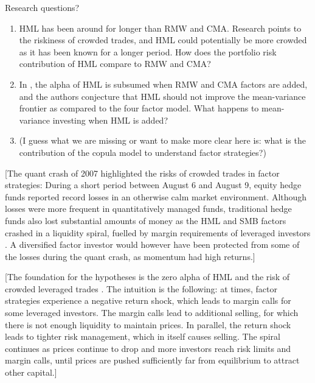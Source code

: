 Research questions?
\begin{enumerate}
	\item HML has been around for longer than RMW and CMA. Research points to the riskiness of crowded trades, and HML could potentially be more crowded as it has been known for a longer period. How does the portfolio risk contribution of HML compare to RMW and CMA?
	\item In \textcite{FF2015}, the alpha of HML is subsumed when RMW and CMA factors are added, and the authors conjecture that HML should not improve the mean-variance frontier as compared to the four factor model. What happens to mean-variance investing when HML is added?
	\item (I guess what we are missing or want to make more clear here is: what is the contribution of the copula model to understand factor strategies?)
\end{enumerate}

[The quant crash of 2007 highlighted the risks of crowded trades in factor strategies: During a short period between August 6 and August 9, equity hedge funds reported record losses in an otherwise calm market environment. Although losses were more frequent in quantitatively managed funds, traditional hedge funds also lost substantial amounts of money as the HML and SMB factors crashed in a liquidity spiral, fuelled by margin requirements of leveraged investors \autocite{KhandaniLo2011}. A diversified factor investor would however have been protected from some of the losses during the quant crash, as momentum had high returns.]

[The foundation for the hypotheses is the zero alpha of HML \autocite{FF2015} and the risk of crowded leveraged trades \autocite{Brunnermeier2009}. The intuition is the following: at times, factor strategies experience a negative return shock, which leads to margin calls for some leveraged investors. The margin calls lead to additional selling, for which there is not enough liquidity to maintain prices. In parallel, the return shock leads to tighter risk management, which in itself causes selling. The spiral continues as prices continue to drop and more investors reach risk limits and margin calls, until prices are pushed sufficiently far from equilibrium to attract other capital.]
